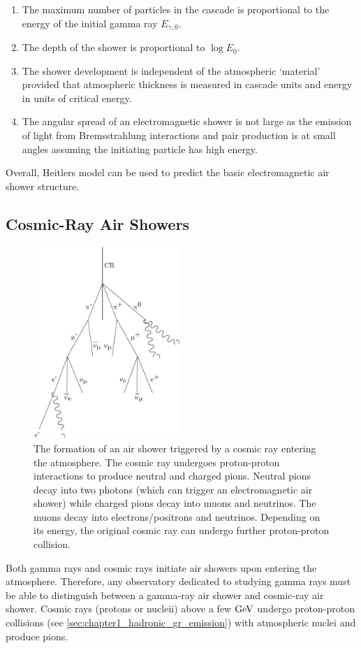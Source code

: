 \begin{enumerate}
    \itemsep0em
	\item The maximum number of particles in the cascade is proportional to the energy of the initial gamma ray $E_{\gamma,0}$.
	\item The depth of the shower is proportional to $\log E_0$.
	\item The shower development is independent of the atmospheric `material' provided that atmospheric thickness is measured in cascade units and energy in units of critical energy.
    \item The angular spread of an electromagnetic shower is not large as the emission of light from Bremsstrahlung interactions and pair production is at small angles assuming the initiating particle has high energy.
\end{enumerate}
\noindent Overall, Heitlers model can be used to predict the basic electromagnetic air shower structure.

\subsection{Cosmic-Ray Air Showers}
\begin{figure}
    \includegraphics[width=0.5\textwidth]{05_Astronomy/Images/air_shower/cosmic_ray.pdf}
    \caption{The formation of an air shower triggered by a cosmic ray entering the atmosphere. The cosmic ray undergoes proton-proton interactions to produce neutral and charged pions. Neutral pions decay into two photons (which can trigger an electromagnetic air shower) while charged pions decay into muons and neutrinos. The muons decay into electrons/positrons and neutrinos. Depending on its energy, the original cosmic ray can undergo further proton-proton collision.}
    \label{fig:chapter_2_air_shower_hadron}
\end{figure}
Both gamma rays and cosmic rays initiate air showers upon entering the atmosphere. Therefore, any observatory dedicated to studying gamma rays must be able to distinguish between a gamma-ray air shower and cosmic-ray air shower.
\newpar
Cosmic rays (protons or nucleii) above a few $\si{\giga\electronvolt}$ undergo proton-proton collisions (see \autoref{sec:chapter1_hadronic_gr_emission}) with atmospheric nuclei and produce pions.

